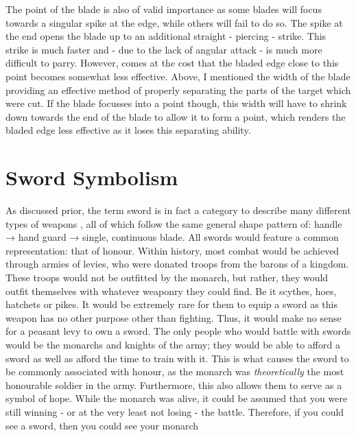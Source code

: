 \documentclass{article}
\begin{document}
The point of the blade is also of valid importance as some blades will focus towards a singular spike at the edge, while others will fail to do so. The spike at the end opens the blade up to an additional straight - piercing - strike. This strike is much faster and - due to the lack of angular attack - is much more difficult to parry. However, comes at the cost that the bladed edge close to this point becomes somewhat less effective. Above, I mentioned the width of the blade providing an effective method of properly separating the parts of the target which were cut. If the blade focusses into a point though, this width will have to shrink down towards the end of the blade to allow it to form a point, which renders the bladed edge less effective as it loses this separating ability.

\pagebreak

\section{Sword Symbolism} \label{swordSymbol}
As discussed prior, the term sword is in fact a category to describe many different types of weapons \parencite{furat1998brief}, all of which follow the same general shape pattern of: handle → hand guard → single, continuous blade.
All swords would feature a common representation: that of honour. Within history, most combat would be achieved through armies of levies, who were donated troops from the barons of a kingdom. These troops would not be outfitted by the monarch, but rather, they would outfit themselves with whatever weaponry they could find. Be it scythes, hoes, hatchets or pikes. It would be extremely rare for them to equip a sword as this weapon has no other purpose other than fighting. Thus, it would make no sense for a peasant levy to own a sword. The only people who would battle with swords would be the monarchs and knights of the army; they would be able to afford a sword as well as afford the time to train with it. This is what causes the sword to be commonly associated with honour, as the monarch was \textit{theoretically} the most honourable soldier in the army. Furthermore, this also allows them to serve as a symbol of hope. While the monarch was alive, it could be assumed that you were still winning - or at the very least not losing - the battle. Therefore, if you could see a sword, then you could see your monarch
\end{document}
